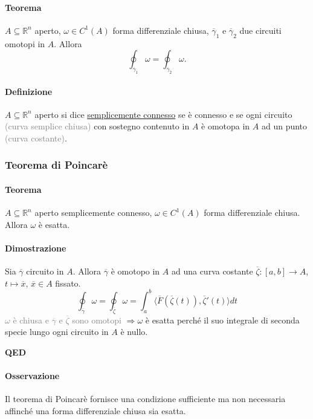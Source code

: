\documentclass{article}
\newcommand{\R}{\mathbb{R}}
\begin{document}
\paragraph{{Teorema}}
$A \subseteq \R^n$ aperto, $\omega \in C^1(A)$ forma differenziale chiusa, $\overline{\gamma}_1$ e $\overline{\gamma}_2$ due circuiti omotopi in $A$. Allora
\begin{equation*}
    \oint_{\overline{\gamma}_1}\omega=\oint_{\overline{\gamma}_2}\omega.
\end{equation*}

\paragraph{{Definizione}}
$A \subseteq \R^n$ aperto si dice \underline{semplicemente connesso} se è connesso e se ogni circuito  \textcolor{grey}{(curva semplice chiusa)} con sostegno contenuto in $A$ è omotopa in $A$ ad un punto \textcolor{grey}{(curva costante)}.


\subsubsection{{Teorema di Poincarè}}
\paragraph{{Teorema}}
$A \subseteq \R^n$ aperto semplicemente connesso, $\omega \in C^1(A)$ forma differenziale chiusa. Allora $\omega$ è esatta. 

\paragraph{{Dimostrazione}}
Sia $\overline{\gamma}$ circuito in $A$. Allora $\overline{\gamma}$ è omotopo in $A$ ad una curva costante $\overline{\zeta}:[a,b]\rightarrow A$, $t \mapsto \overline{x}$, $\overline{x}\in A$ fissato.
\begin{equation*}
    \oint_{\overline{\gamma}} \omega = \oint_{\overline{\zeta}} \omega= \int_a^b \langle \overline{F}(\overline{\zeta}(t)), \overline{\zeta}'(t)\rangle dt
\end{equation*}
\textcolor{grey}{$\omega$ è chiusa e $\overline{\gamma}$ e $\overline{\zeta}$ sono omotopi}
$\Rightarrow \omega$ è esatta perché il suo integrale di seconda specie lungo ogni circuito in $A$ è nullo.
\begin{flushright}
    \textbf{QED}
\end{flushright}

\paragraph{{Osservazione}}
Il teorema di Poincarè fornisce una condizione sufficiente ma non necessaria affinché una forma differenziale chiusa sia esatta.
\end{document}
